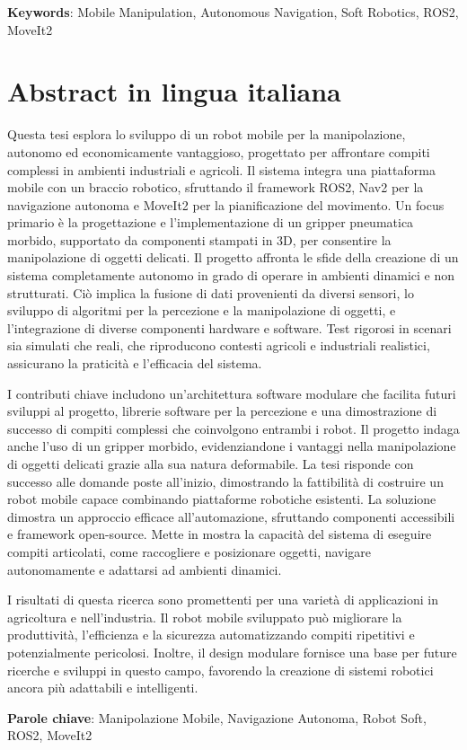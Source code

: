 \textbf{Keywords}: Mobile Manipulation, Autonomous Navigation, Soft Robotics, ROS2, MoveIt2

\chapter*{Abstract in lingua italiana}

Questa tesi esplora lo sviluppo di un robot mobile per la manipolazione, autonomo ed economicamente vantaggioso,
progettato per affrontare compiti complessi in ambienti industriali e agricoli. Il sistema integra una piattaforma 
mobile con un braccio robotico, sfruttando il framework ROS2, Nav2 per la navigazione autonoma e 
MoveIt2 per la pianificazione del movimento. Un focus primario è la progettazione e l'implementazione di un gripper 
pneumatica morbido, supportato da componenti stampati in 3D, per consentire la manipolazione di oggetti delicati.
Il progetto affronta le sfide della creazione di un sistema completamente autonomo in grado di operare in ambienti dinamici
e non strutturati. Ciò implica la fusione di dati provenienti da diversi sensori, lo sviluppo di algoritmi
per la percezione e la manipolazione di oggetti, e l'integrazione di diverse componenti hardware e software. 
Test rigorosi in scenari sia simulati che reali, che riproducono contesti agricoli e industriali realistici, 
assicurano la praticità e l'efficacia del sistema.

I contributi chiave includono un'architettura software modulare che facilita futuri sviluppi al progetto, librerie 
software per la percezione e una dimostrazione di successo di compiti complessi che coinvolgono entrambi i robot. 
Il progetto indaga anche l'uso di un gripper morbido, evidenziandone i vantaggi nella manipolazione di oggetti delicati
grazie alla sua natura deformabile.
La tesi risponde con successo alle domande poste all'inizio, dimostrando la fattibilità di costruire un robot mobile
capace combinando piattaforme robotiche esistenti. La soluzione dimostra un approccio efficace
all'automazione, sfruttando componenti accessibili e framework open-source. Mette in mostra la capacità del
sistema di eseguire compiti articolati, come raccogliere e posizionare oggetti, navigare autonomamente e 
adattarsi ad ambienti dinamici.

I risultati di questa ricerca sono promettenti per una varietà di applicazioni in agricoltura e nell'industria. 
Il robot mobile sviluppato può migliorare la produttività, l'efficienza e la sicurezza automatizzando compiti
ripetitivi e potenzialmente pericolosi. Inoltre, il design modulare fornisce una base per future ricerche e
sviluppi in questo campo, favorendo la creazione di sistemi robotici ancora più adattabili e intelligenti.

{
\begin{adjustwidth}{0cm}{-0.1cm} %
\textbf{Parole chiave}: Manipolazione Mobile, Navigazione Autonoma, Robot Soft, ROS2, MoveIt2
\end{adjustwidth}
}